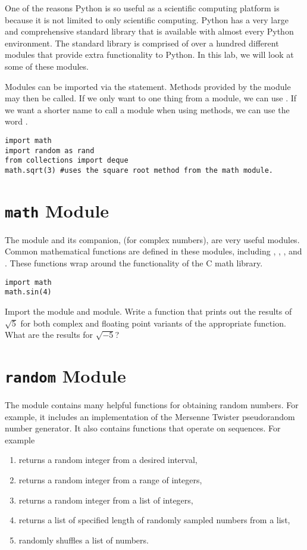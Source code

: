 
One of the reasons Python is so useful as a scientific computing platform is because it is not limited to only scientific computing.
Python has a very large and comprehensive standard library that is available with almost every Python environment.
The standard library is comprised of over a hundred different modules that provide extra functionality to Python.
In this lab, we will look at some of these modules.

Modules can be imported via the  statement. Methods provided by the module may then be called.
If we only want to one thing from a module, we can use .
If we want a shorter name to call a module when using methods, we can use the word .
\begin{lstlisting}
import math
import random as rand
from collections import deque
math.sqrt(3) #uses the square root method from the math module.
\end{lstlisting}

\section*{\texttt{math} Module}
The  module and its companion,  (for complex numbers), are very useful modules.
Common mathematical functions are defined in these modules, including , , , and .
These functions wrap around the functionality of the C math library.
\begin{lstlisting}
import math
math.sin(4)
\end{lstlisting}

\begin{problem}
Import the  module and  module. Write a function that prints out the results of $\sqrt{5}$ for both complex and floating point variants of the appropriate function.  What are the results for $\sqrt{-5}$?
\end{problem}

\section*{\texttt{random} Module}
The  module contains many helpful functions for obtaining random numbers.
For example, it includes an implementation of the Mersenne Twister pseudorandom number generator.
It also contains functions that operate on sequences.  For example
\begin{enumerate}
\item {} returns a random integer from a desired interval,
\item {} returns a random integer from a range of integers,
\item {} returns a random integer from a list of integers,
\item {} returns a list of specified length of randomly sampled numbers from a list,
\item {} randomly shuffles a list of numbers.
\end{enumerate}

